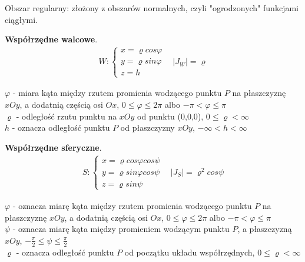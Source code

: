 \documentclass[main.tex]{subfiles}
\begin{document}
    Obszar regularny: złożony z obszarów normalnych, czyli "ogrodzonych" funkcjami ciągłymi.

    \begin{definition}
        \textbf{Współrzędne walcowe}.
        \begin{gather*}
            W: \begin{cases}
                   x = \varrho cos \varphi \\
                   y = \varrho sin \varphi \\
                   z = h
            \end{cases} ~~~~
            |J_W| = \varrho
        \end{gather*}

        $\varphi$ - miara kąta między rzutem promienia wodzącego punktu $P$ na płaszczyznę $xOy$, a dodatnią częścią
        osi $Ox$, $0 \leq \varphi \leq 2 \pi$ albo $-\pi < \varphi \leq \pi$\\

        $\varrho$ - odległość rzutu punktu na $xOy$ od punktu (0,0,0), $0 \leq \varrho < \infty$\\

        $h$ - oznacza odległość punktu $P$ od płaszczyzny $xOy$, $-\infty < h < \infty$
    \end{definition}

    \begin{definition}
        \textbf{Współrzędne sferyczne}.
        \begin{align*}
            S: \begin{cases}
                   x = \varrho cos \varphi cos \psi \\
                   y = \varrho sin \varphi cos \psi \\
                   z = \varrho sin \psi
            \end{cases} ~~~~
            |J_S| = \varrho^2 cos \psi
        \end{align*}

        $\varphi$ - oznacza miarę kąta między rzutem promienia wodzącego punktu $P$ na płaszczyznę $xOy$, a dodatnią częścią
        osi $Ox$, $0 \leq \varphi \leq 2 \pi$ albo $-\pi < \varphi \leq \pi$\\

        $\psi$ - oznacza miarę kąta między promieniem wodzącym punktu $P$, a płaszczyzną $xOy$, $-\frac{\pi}{2} \leq \psi \leq \frac{\pi}{2}$\\

        $\varrho$ - oznacza odległość punktu $P$ od początku układu współrzędnych, $0 \leq \varrho < \infty$
    \end{definition}
\end{document}

